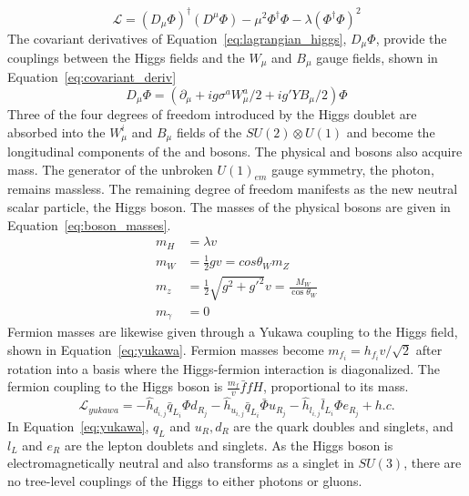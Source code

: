 \begin{equation}
    \mathcal{L} = (D_\mu\Phi)^\dagger(D^\mu\Phi) - \mu^2 \Phi^\dagger\Phi - \lambda(\Phi^\dagger\Phi)^2
    \label{eq:lagrangian_higgs}
\end{equation}
The covariant derivatives of Equation~\ref{eq:lagrangian_higgs}, $D_\mu\Phi$, provide the couplings between the Higgs fields and the $W_\mu$ and $B_\mu$ gauge fields, shown in Equation~\ref{eq:covariant_deriv}
\begin{equation}
    D_\mu \Phi = (\partial_\mu + ig\sigma^aW_\mu^a/2 + ig'YB_\mu/2)\Phi
    \label{eq:covariant_deriv}
\end{equation}
Three of the four degrees of freedom introduced by the Higgs doublet are absorbed into the $W^i_\mu$ and $B_\mu$ fields of the $SU(2)\otimes U(1)$ and become the longitudinal components of the \W and \Z bosons. The physical \W and \Z bosons also acquire mass. The generator of the unbroken $U(1)_{em}$ gauge symmetry, the photon, remains massless. The remaining degree of freedom manifests as the new neutral scalar particle, the Higgs boson. The masses of the physical bosons are given in Equation~\ref{eq:boson_masses}.
\begin{equation}
\begin{aligned}
m_H &= \lambda v \\ 
m_W &= \frac{1}{2}g v = cos\theta_W m_Z \\ 
m_z &= \frac{1}{2}\sqrt{g^2+g'^2}v  = \frac{M_W}{\cos{\theta_W}}\\ 
m_\gamma &= 0
\end{aligned}
\label{eq:boson_masses}
\end{equation}
Fermion masses are likewise given through a Yukawa coupling to the Higgs field, shown in Equation~\ref{eq:yukawa}. Fermion masses become $m_{f_i} = h_{f_i} v / \sqrt{2}$ after rotation into a basis where the Higgs-fermion interaction is diagonalized. The fermion coupling to the Higgs boson is $\frac{m_f}{v}\bar{f}fH$, proportional to its mass.
\begin{equation}
\mathcal{L}_{yukawa} = -\hat{h}_{d_{i,j}}\bar{q}_{L_i}\Phi d_{R_j} - \hat{h}_{u_{i,j}}\bar{q}_{L_i}\bar{\Phi} u_{R_j} -\hat{h}_{l_{i,j}}\bar{l}_{L_i}\Phi e_{R_j} + h.c.
    \label{eq:yukawa}
\end{equation}
In Equation~\ref{eq:yukawa}, $q_L$ and $u_R,d_R$ are the quark doubles and singlets, and $l_L$ and $e_R$ are the lepton doublets and singlets. As the Higgs boson is electromagnetically neutral and also transforms as a singlet in $SU(3)$, there are no tree-level couplings of the Higgs to either photons or gluons.

